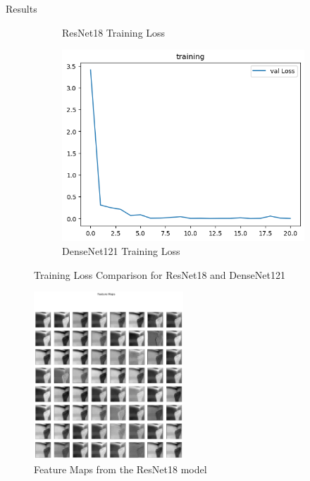 \documentclass[12pt, a4paper]{article}
\begin{document}
\begin{section}{Results}
\begin{figure}[H]
\begin{subfigure}[b]{0.45\textwidth}
            \caption{ResNet18 Training Loss}
            \label{fig:resnet18_training}
        \end{subfigure}
        \hfill
        \begin{subfigure}[b]{0.45\textwidth}
            \centering
            \includegraphics[width=\textwidth]{../plots/DenseNet121_training.png}
            \caption{DenseNet121 Training Loss}
            \label{fig:densenet121_training}
        \end{subfigure}
        \caption{Training Loss Comparison for ResNet18 and DenseNet121}
        \label{fig:training_loss}
    \end{figure}
    \begin{figure}[H]
        \centering
        \includegraphics[width=0.5\textwidth]{../plots/ResNet18_Visualize.png}
        \caption{Feature Maps from the ResNet18 model}
        \label{fig:resnet18_visualize}

\end{figure}
\end{section}
\end{document}
